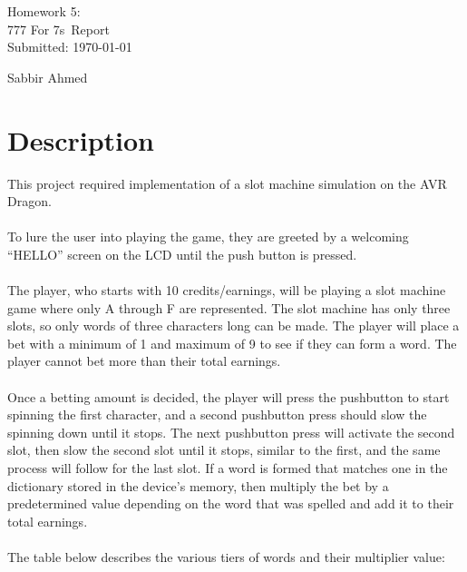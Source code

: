 \documentclass[usletter, 12pt]{article}
\newcommand{\project}{Homework 5: \\ 777 For 7s}
\newcommand{\Sabbir}{Sabbir Ahmed}
\begin{document}
    \begin{titlepage}

        \vspace*{\fill} %
        \begin{center}

            {\LARGE \project~Report}\\ [1.5cm]

            Submitted: \today
            
            \vspace*{\fill}

            \Sabbir

        \end{center}
        \vspace*{\fill} %

    \end{titlepage}

    \section{Description} This project required implementation of a slot machine simulation on the AVR Dragon. \\~\\
    \noindent To lure the user into playing the game, they are greeted by a
    welcoming “HELLO” screen on the LCD until the push button is pressed. \\~\\
    \noindent The player, who starts with 10 credits/earnings, will be playing
    a slot machine game where only A through F are represented. The slot
    machine has only three slots, so only words of three characters long can be
    made. The player will place a bet with a minimum of 1 and maximum of 9 to
    see if they can form a word. The player cannot bet more than their total
    earnings. \\~\\
    \noindent Once a betting amount is decided, the player will press the
    pushbutton to start spinning the first character, and a second pushbutton
    press should slow the spinning down until it stops. The next pushbutton
    press will activate the second slot, then slow the second slot until it
    stops, similar to the first, and the same process will follow for the last
    slot. If a word is formed that matches one in the dictionary stored in the
    device’s memory, then multiply the bet by a predetermined value depending
    on the word that was spelled and add it to their total earnings. \\~\\
    \noindent The table below describes the various tiers of words and their
    multiplier value:
\end{document}
